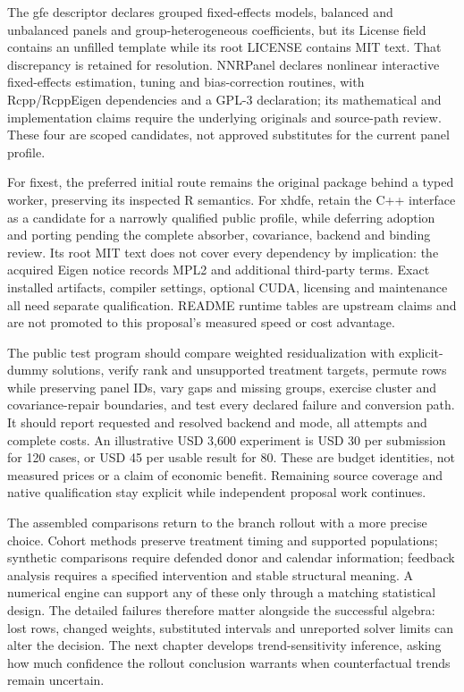 The gfe descriptor declares grouped fixed-effects models, balanced and
unbalanced panels and group-heterogeneous coefficients, but its License field
contains an unfilled template while its root LICENSE contains MIT text.
That discrepancy is retained for resolution. NNRPanel declares nonlinear
interactive fixed-effects estimation, tuning and bias-correction routines,
with Rcpp/RcppEigen dependencies and a GPL-3 declaration; its mathematical
and implementation claims require the underlying originals and source-path
review. These four are scoped candidates, not approved substitutes for the
current panel profile.~\citep{exec25_panelcxx_gfe,exec25_panelcxx_nnr}

For fixest, the preferred initial route remains the original package behind
a typed worker, preserving its inspected R semantics. For xhdfe, retain
the C++ interface as a candidate for a narrowly qualified public profile,
while deferring adoption and porting pending the complete absorber,
covariance, backend and binding review. Its root MIT text does not cover
every dependency by implication: the acquired Eigen notice records MPL2
and additional third-party terms. Exact installed artifacts, compiler
settings, optional CUDA, licensing and maintenance all need separate
qualification. README runtime tables are upstream claims and are not
promoted to this proposal's measured speed or cost advantage.
\citep{exec20_fixest_source,exec25_panelcxx_xhdfe,exec25_panelcxx_reference}

The public test program should compare weighted residualization with
explicit-dummy solutions, verify rank and unsupported treatment targets,
permute rows while preserving panel IDs, vary gaps and missing groups,
exercise cluster and covariance-repair boundaries, and test every declared
failure and conversion path. It should report requested and resolved
backend and mode, all attempts and complete costs. An illustrative USD
3,600 experiment is USD 30 per submission for 120 cases, or USD 45 per
usable result for 80. These are budget identities, not measured prices
or a claim of economic benefit. Remaining source coverage and native
qualification stay explicit while independent proposal work continues.
\citep{exec25_panelcxx_reference}

The assembled comparisons return to the branch rollout with a more precise
choice. Cohort methods preserve treatment timing and supported populations;
synthetic comparisons require defended donor and calendar information;
feedback analysis requires a specified intervention and stable structural
meaning. A numerical engine can support any of these only through a matching
statistical design. The detailed failures therefore matter alongside the
successful algebra: lost rows, changed weights, substituted intervals and
unreported solver limits can alter the decision. The next chapter develops
trend-sensitivity inference, asking how much confidence the rollout conclusion
warrants when counterfactual trends remain uncertain.

